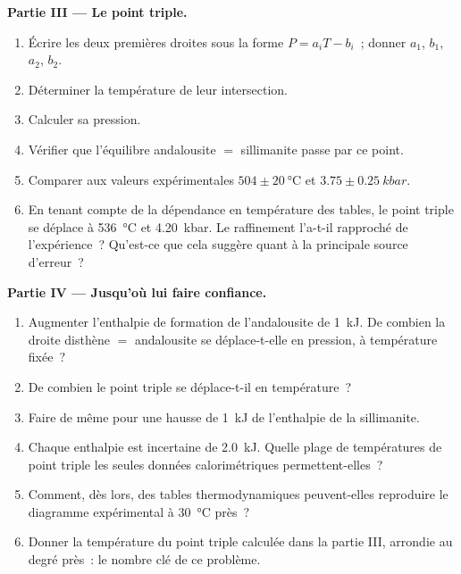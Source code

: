 \begin{problem}
\noindent\textbf{Partie III --- Le point triple.}
\begin{enumerate}[resume]
\item Écrire les deux premières droites sous la forme $P = a_i T - b_i$~; donner $a_1$, $b_1$, $a_2$, $b_2$.
\item Déterminer la température de leur intersection.
\item Calculer sa pression.
\item Vérifier que l'équilibre andalousite $=$ sillimanite passe par ce point.
\item Comparer aux valeurs expérimentales $504 \pm \qty{20}{\celsius}$ et $3.75 \pm
\qty{0.25}{kbar}$.
\item En tenant compte de la dépendance en température des tables, le point triple se déplace à
\qty{536}{\celsius} et \qty{4.20}{kbar}. Le raffinement l'a-t-il rapproché de
l'expérience~? Qu'est-ce que cela suggère quant à la principale source d'erreur~?
\end{enumerate}

\noindent\textbf{Partie IV --- Jusqu'où lui faire confiance.}
\begin{enumerate}[resume]
\item Augmenter l'enthalpie de formation de l'andalousite de \qty{1}{kJ}. De combien la droite
disthène $=$ andalousite se déplace-t-elle en pression, à température fixée~?
\item De combien le point triple se déplace-t-il en température~?
\item Faire de même pour une hausse de \qty{1}{kJ} de l'enthalpie de la sillimanite.
\item Chaque enthalpie est incertaine de \qty{2.0}{kJ}. Quelle plage de températures de point triple
les seules données calorimétriques permettent-elles~?
\item Comment, dès lors, des tables thermodynamiques peuvent-elles reproduire le diagramme expérimental à
\qty{30}{\celsius} près~?
\item Donner la température du point triple calculée dans la partie III, arrondie au
degré près~: le nombre clé de ce problème.
\end{enumerate}
\end{problem}

